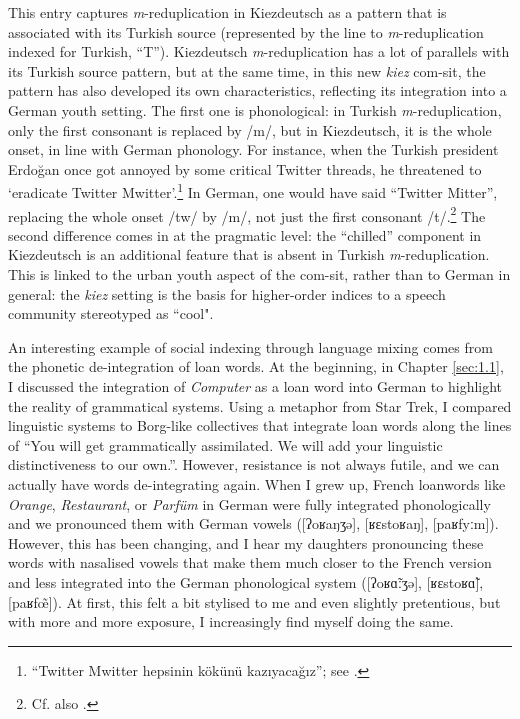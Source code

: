 This entry captures \textit{m}{}-reduplication in Kiezdeutsch as a pattern that is associated with its Turkish source (represented by the line to \textit{m}{}-reduplication indexed for Turkish, “T”). Kiezdeutsch \textit{m}{}-reduplication has a lot of parallels with its Turkish source pattern, but at the same time, in this new \textit{kiez} com-sit, the pattern has also developed its own characteristics, reflecting its integration into a German youth setting. The first one is phonological: in Turkish \textit{m}{}-reduplication, only the first consonant is replaced by /m/, but in Kiezdeutsch, it is the whole onset, in line with German phonology. For instance, when the Turkish president Erdoğan once got annoyed by some critical Twitter threads, he threatened to ‘eradicate Twitter Mwitter’.\footnote{“Twitter Mwitter hepsinin kökünü kazıyacağız”; see \citet[247]{WiesePolat2016}.} In German, one would have said “Twitter Mitter”, replacing the whole onset /tw/ by /m/, not just the first consonant /t/.\footnote{Cf. also \citet{Stamer2014}.} The second difference comes in at the pragmatic level: the “chilled” component in Kiezdeutsch is an additional feature that is absent in Turkish \textit{m}{}-reduplication. This is linked to the urban youth aspect of the com-sit, rather than to German in general: the \textit{kiez} setting is the basis for higher-order indices to a speech community stereotyped as “cool".

An interesting example of social indexing through language mixing comes from the phonetic de-integration of loan words. At the beginning, in Chapter \ref{sec:1.1}, I discussed the integration of \textit{Computer} as a loan word into German to highlight the reality of grammatical systems. Using a metaphor from Star Trek, I compared linguistic systems to Borg-like collectives that integrate loan words along the lines of “You will get grammatically assimilated. We will add your linguistic distinctiveness to our own.”. However, resistance is not always futile, and we can actually have words de-integrating again. When I grew up, French loanwords like \textit{Orange}, \textit{Restaurant}, or \textit{Parfüm} in German were fully integrated phonologically and we pronounced them with German vowels ([{ʔ}oʁa{ŋ}ʒə], [ʁɛstoʁa{ŋ}], [paʁfyːm]). However, this has been changing, and I hear my daughters pronouncing these words with nasalised vowels that make them much closer to the French version and less integrated into the German phonological system ([{ʔ}oʁ\~ɑːʒə], [ʁɛstoʁ\~ɑ], [paʁf\~{œ}]). At first, this felt a bit stylised to me and even slightly pretentious, but with more and more exposure, I increasingly find myself doing the same.

